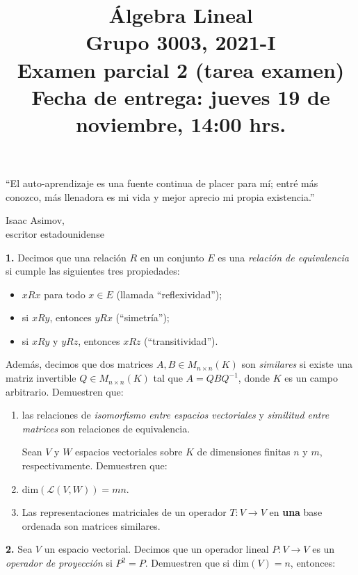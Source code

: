\documentclass[a4paper]{article}
\begin{document}
\title{Álgebra Lineal \\ Grupo 3003, 2021-I \\ Examen parcial 2 (tarea examen) \\ Fecha de entrega: jueves 19 de noviembre, 14:00 hrs.}
\date{}
\maketitle

\epigraph{``El auto-aprendizaje es una fuente continua de placer para mí; entré más conozco, más llenadora es mi vida y mejor aprecio mi propia existencia.''}{\textemdash Isaac Asimov, \\ escritor estadounidense}

\vspace{3mm}
\textbf{1.} Decimos que una relación $R$ en un conjunto $E$ es una \textit{relación de equivalencia} si cumple las siguientes tres propiedades:
\begin{itemize}
    \item $xRx$ para todo $x\in E$ (llamada ``reflexividad'');
    \item si $xRy$, entonces $yRx$ (``simetría'');
    \item si $xRy$ y $yRz$, entonces $xRz$ (``transitividad'').
\end{itemize}

\noindent Además, decimos que dos matrices $A,B\in M_{n\times n}(K)$ son \emph{similares} si existe una matriz invertible $Q\in M_{n\times n}(K)$ tal que $A=QBQ^{-1}$, donde $K$ es un campo arbitrario. Demuestren que:

\begin{enumerate}[label=\alph*)]
    \item las relaciones de \emph{isomorfismo entre espacios vectoriales} y \emph{similitud entre matrices} son relaciones de equivalencia.

\hspace{-1cm} Sean $V$ y $W$ espacios vectoriales sobre $K$ de dimensiones finitas $n$ y $m$, respectivamente. Demuestren que:
    \item $\text{dim}(\mathcal{L}(V,W))=mn$.
    \item Las representaciones matriciales de un operador $T:V\to V$ en \textbf{una} base ordenada son matrices similares.
\end{enumerate}

\vspace{3mm}
\textbf{2.} Sea $V$ un espacio vectorial. Decimos que un operador lineal $P:V\to V$ es un \emph{operador de proyección} si $P^2=P$. Demuestren que si $\text{dim}(V)=n$, entonces:
\end{document}

